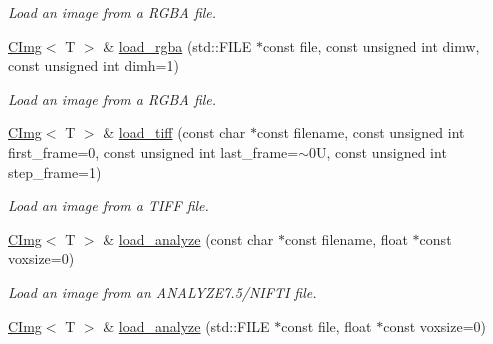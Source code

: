 \begin{DoxyCompactItemize}
\begin{DoxyCompactList}\small\item\em Load an image from a RGBA file. \item\end{DoxyCompactList}\item 
\hypertarget{structcimg__library_1_1CImg_ad8a352721659c6524a3967c6976f08d5}{
\hyperlink{structcimg__library_1_1CImg}{CImg}$<$ T $>$ \& \hyperlink{structcimg__library_1_1CImg_ad8a352721659c6524a3967c6976f08d5}{load\_\-rgba} (std::FILE $\ast$const file, const unsigned int dimw, const unsigned int dimh=1)}
\label{structcimg__library_1_1CImg_ad8a352721659c6524a3967c6976f08d5}

\begin{DoxyCompactList}\small\item\em Load an image from a RGBA file. \item\end{DoxyCompactList}\item 
\hyperlink{structcimg__library_1_1CImg}{CImg}$<$ T $>$ \& \hyperlink{structcimg__library_1_1CImg_ab943c007a92b463ec458b4be80e80460}{load\_\-tiff} (const char $\ast$const filename, const unsigned int first\_\-frame=0, const unsigned int last\_\-frame=$\sim$0U, const unsigned int step\_\-frame=1)
\begin{DoxyCompactList}\small\item\em Load an image from a TIFF file. \item\end{DoxyCompactList}\item 
\hypertarget{structcimg__library_1_1CImg_ab56eb4920a37739b113bd90ed65b4506}{
\hyperlink{structcimg__library_1_1CImg}{CImg}$<$ T $>$ \& \hyperlink{structcimg__library_1_1CImg_ab56eb4920a37739b113bd90ed65b4506}{load\_\-analyze} (const char $\ast$const filename, float $\ast$const voxsize=0)}
\label{structcimg__library_1_1CImg_ab56eb4920a37739b113bd90ed65b4506}

\begin{DoxyCompactList}\small\item\em Load an image from an ANALYZE7.5/NIFTI file. \item\end{DoxyCompactList}\item 
\hypertarget{structcimg__library_1_1CImg_a302f23966319d46fbafad3c1d5cfb839}{
\hyperlink{structcimg__library_1_1CImg}{CImg}$<$ T $>$ \& \hyperlink{structcimg__library_1_1CImg_a302f23966319d46fbafad3c1d5cfb839}{load\_\-analyze} (std::FILE $\ast$const file, float $\ast$const voxsize=0)}
\label{structcimg__library_1_1CImg_a302f23966319d46fbafad3c1d5cfb839}


\end{DoxyCompactItemize}
